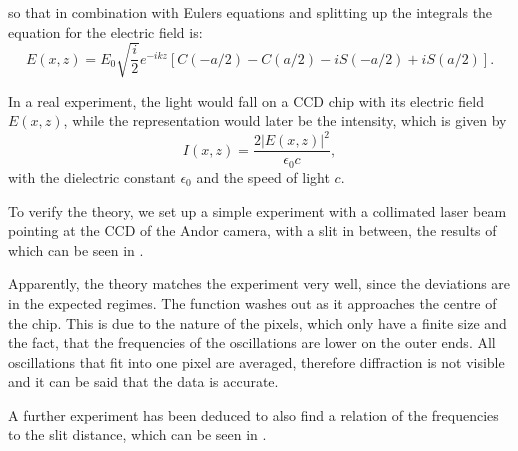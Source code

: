 so that in combination with Eulers equations and splitting up the integrals the equation for the electric field is:
\begin{equation}
E(x,z) = E_0 \sqrt{\frac{i}{2}} e^{-ikz} \left [ C(-a/2) - C(a/2) - iS(-a/2) + iS(a/2) \right ].
\end{equation}

In a real experiment, the light would fall on a CCD chip with its electric field $E(x,z)$, while the representation would later be the intensity, which is given by
\begin{equation}
I(x,z) = \frac{2 \lvert E(x,z) \rvert ^2}{\epsilon_0 c} ,
\end{equation}
with the dielectric constant $\epsilon_0$ and the speed of light $c$.

To verify the theory, we set up a simple experiment with a collimated laser beam pointing at the CCD of the Andor camera, with a slit in between, the results of which can be seen in .


Apparently, the theory matches the experiment very well, since the deviations are in the expected regimes.
The function washes out as it approaches the centre of the chip. This is due to the nature of the pixels, which only have a finite size and the fact, that the frequencies of the oscillations are lower on the outer ends. All oscillations that fit into one pixel are averaged, therefore diffraction is not visible and it can be said that the data is accurate.

A further experiment has been deduced to also find a relation of the frequencies to the slit distance, which can be seen in .


